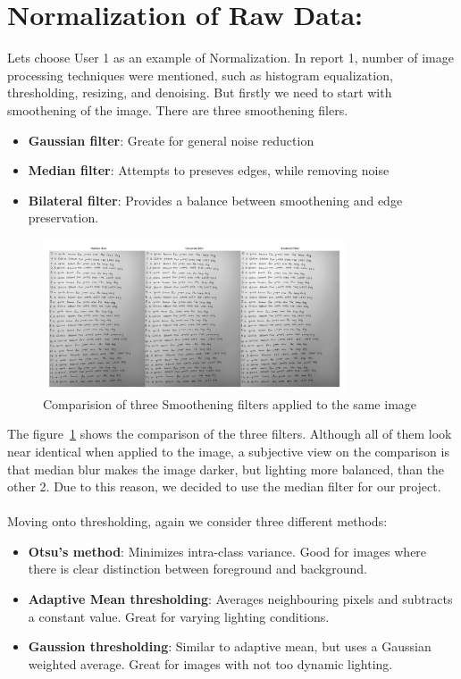 \documentclass[twoside,a4paper]{article}
\begin{document}
\section{Normalization of Raw Data: }
Lets choose User 1 as an example of Normalization. In report 1, number of image processing techniques were mentioned, such as histogram equalization,
thresholding, resizing, and denoising. But firstly we need to start with smoothening of the image. There are three smoothening filers.
\begin{itemize}
  \item \textbf{Gaussian filter}: Greate for general noise reduction
  \item \textbf{Median filter}: Attempts to preseves edges, while removing noise
  \item \textbf{Bilateral filter}: Provides a balance between smoothening and edge preservation.
\end{itemize}
\begin{figure}[H]
  \centering
  \includegraphics[width=0.8\textwidth]{Comparison_Blues.png}
  \caption{Comparision of three Smoothening filters applied to the same image}
  \label{fig:smoothening_filters}
\end{figure}
The figure~\ref{fig:smoothening_filters} shows the comparison of the three filters. Although all of them look near identical when applied to the image, a subjective view on the comparison is that median blur makes the image darker, but lighting more balanced, than the other 2.
Due to this reason, we decided to use the median filter for our project.\\
\\
Moving onto thresholding, again we consider three different methods:
\begin{itemize}
  \item \textbf{Otsu's method}: Minimizes intra-class variance. Good for images where there is clear distinction between foreground and background.
  \item \textbf{Adaptive Mean thresholding}: Averages neighbouring pixels and subtracts a constant value. Great for varying lighting conditions.
  \item \textbf{Gaussion thresholding}: Similar to adaptive mean, but uses a Gaussian weighted average. Great for images with not too dynamic lighting.
\end{itemize}
\end{document}
